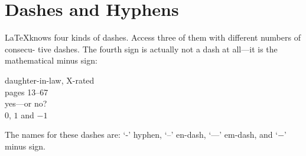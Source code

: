 \documentclass{article}
\begin{document}
\section{Dashes and Hyphens}

\LaTeX knows four kinds of dashes. Access three of them with different numbers of consecu-
tive dashes. The fourth sign is actually not a dash at all—it is the mathematical minus
sign:

\begin{center}
daughter-in-law, X-rated\\
pages 13--67\\
yes---or no? \\
$0$, $1$ and $-1$
\end{center}

The names for these dashes are: ‘-’ hyphen, ‘--’ en-dash, ‘---’ em-dash,
and ‘$-$’ minus sign.
\end{document}
